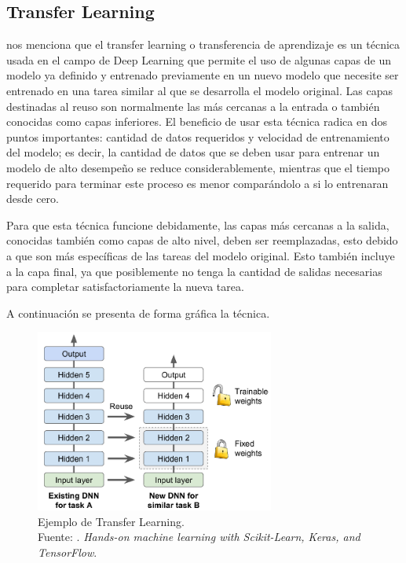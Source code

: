 \subsection{Transfer Learning}
\cite{bk_geron2022handml} nos menciona que el transfer learning o transferencia de aprendizaje es un técnica usada en el campo de Deep Learning que permite el uso de algunas capas de un modelo ya definido y entrenado previamente en un nuevo modelo que necesite ser entrenado en una tarea similar al que se desarrolla el modelo original. Las capas destinadas al reuso son normalmente las más cercanas a la entrada o también conocidas como capas inferiores. El beneficio de usar esta técnica radica en dos puntos importantes: cantidad de datos requeridos y velocidad de entrenamiento del modelo; es decir, la cantidad de datos que se deben usar para entrenar un modelo de alto desempeño se reduce considerablemente, mientras que el tiempo requerido para terminar este proceso es menor comparándolo a si lo entrenaran desde cero.

Para que esta técnica funcione debidamente, las capas más cercanas a la salida, conocidas también como capas de alto nivel, deben ser reemplazadas, esto debido a que son más específicas de las tareas del modelo original. Esto también incluye a la capa final, ya que posiblemente no tenga la cantidad de salidas necesarias para completar satisfactoriamente la nueva tarea.

A continuación se presenta de forma gráfica la técnica.

\begin{figure}[H]
	\begin{center}
		\includegraphics[width=0.70\textwidth]{2/figures/transfer_learning.PNG}
		\caption[Ejemplo de Transfer Learning]{Ejemplo de Transfer Learning. \\
		Fuente: \cite{bk_geron2022handml}. \textit{Hands-on machine learning with Scikit-Learn, Keras, and TensorFlow}.}
		\label{2:fig210}
	\end{center}
\end{figure}


